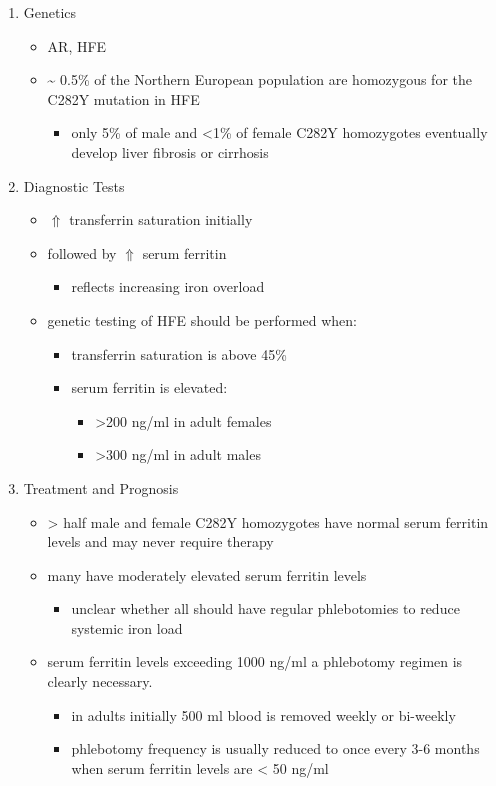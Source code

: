 \documentclass{scrartcl}
\begin{document}
\begin{enumerate}
\item Genetics
\label{sec:orgf418d1f}
\begin{itemize}
\item AR, HFE
\item \textasciitilde{} 0.5\% of the Northern European population are homozygous for the
C282Y mutation in HFE
\begin{itemize}
\item only 5\% of male and <1\% of female C282Y homozygotes eventually
develop liver fibrosis or cirrhosis
\end{itemize}
\end{itemize}

\item Diagnostic Tests
\label{sec:org897ab83}
\begin{itemize}
\item \(\Uparrow\) transferrin saturation initially
\item followed by \(\Uparrow\) serum ferritin
\begin{itemize}
\item reflects increasing iron overload
\end{itemize}
\item genetic testing of HFE should be performed when:
\begin{itemize}
\item transferrin saturation is above 45\%
\item serum ferritin is elevated:
\begin{itemize}
\item >200 ng/ml in adult females
\item >300 ng/ml in adult males
\end{itemize}
\end{itemize}
\end{itemize}

\item Treatment and Prognosis
\label{sec:org4c9a01a}
\begin{itemize}
\item \textgreater{} half male and female C282Y homozygotes have normal serum
ferritin levels and may never require therapy
\item many have moderately elevated serum ferritin levels
\begin{itemize}
\item unclear whether all should have regular
phlebotomies to reduce systemic iron load
\end{itemize}
\item serum ferritin levels exceeding 1000 ng/ml a phlebotomy regimen is clearly
necessary.
\begin{itemize}
\item in adults initially 500 ml blood is removed weekly or bi-weekly
\item phlebotomy frequency is usually reduced to once every 3-6 months
when serum ferritin levels are \textless{} 50 ng/ml
\end{itemize}
\end{itemize}
\end{enumerate}
\end{document}
